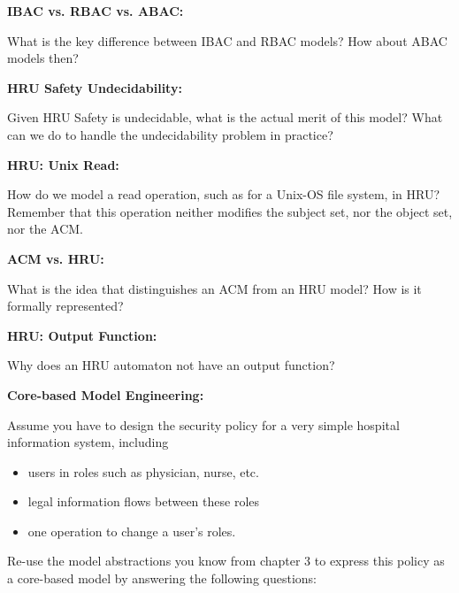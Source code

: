 \documentclass[10pt]{exam}  %
\begin{document}
\begin{questions}
    \question \textbf{IBAC vs. RBAC vs. ABAC:}\hfill

    What is the key difference between IBAC and RBAC models? How about ABAC models then?
    \begin{solution}
    \end{solution}

    \question \textbf{HRU Safety Undecidability:}\hfill

    Given HRU Safety is undecidable, what is the actual merit of this model? What can we do to handle the undecidability problem in practice?
    \begin{solution}
    \end{solution}

    \question \textbf{HRU: Unix Read:}\hfill

    How do we model a read operation, such as for a Unix-OS file system, in HRU? Remember that this operation neither modifies the subject set, nor the object set, nor the ACM.
    \begin{solution}
    \end{solution}

    \question \textbf{ACM vs. HRU:}\hfill

    What is the idea that distinguishes an ACM from an HRU model? How is it formally represented?
    \begin{solution}
    \end{solution}

    \question \textbf{HRU: Output Function:}\hfill

    Why does an HRU automaton not have an output function?
    \begin{solution}
    \end{solution}

    \question \textbf{Core-based Model Engineering:}\hfill

    Assume you have to design the security policy for a very simple hospital information system, including
    \begin{itemize}
        \item users in roles such as physician, nurse, etc.
        \item legal information flows between these roles
        \item one operation to change a user's roles.
    \end{itemize}
    Re-use the model abstractions you know from chapter 3 to express this policy as a core-based model by answering the following questions:
    \begin{parts}

\end{parts}
\end{questions}
\end{document}

